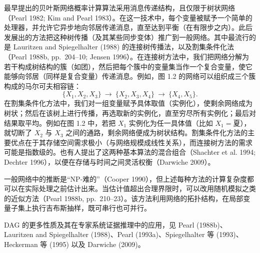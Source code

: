 最早提出的贝叶斯网络概率计算算法采用消息传递结构，且仅限于树状网络（Pearl 1982; Kim and Pearl 1983）。在这一技术中，每个变量被赋予一个简单的处理器，并允许它异步地向邻居传递消息，直至达到平衡（在有限步之内）。此后发展出的方法把这种树传播（及其某些同步变体）推广到一般网络。其中最流行的是 Lauritzen and Spiegelhalter (1988) 的连接树传播法，以及割集条件化法（Pearl 1988b, pp.~204--10; Jensen 1996）。在连接树方法中，我们把网络分解为若干构成树结构的簇（如团），然后把每个簇中的变量集当作一个复合变量，使它能够向邻居（同样是复合变量）传递消息。例如，图 1.2 的网络可以组织成三个簇构成的马尔可夫相容链：
\[
\{X_1,X_2,X_3\}\ \to\ \{X_2,X_3,X_4\}\ \to\ \{X_4,X_5\}.
\]
在割集条件化方法中，我们对一组变量赋予具体取值（实例化），使剩余网络成为树状；然后在该树上进行传播，再选取新的实例化，直至穷尽所有实例化；最后对结果取平均。例如在图 1.2 中，若把 $X_1$ 实例化为任一具体值（比如 $X_1=\text{夏}$），就切断了 $X_2$ 与 $X_3$ 之间的通路，剩余网络便成为树状结构。割集条件化方法的主要优点在于其存储空间需求极小（与网络规模成线性关系），而连接树方法的需求可能是指数级的。也有人提出了这两种基本算法的混合组合（Shachter et al. 1994; Dechter 1996），以便在存储与时间之间灵活权衡（Darwiche 2009）。

一般网络中的推断是“NP-难的”（Cooper 1990），但上述每种方法的计算复杂度都可以在实际处理之前估计出来。当估计值超出合理界限时，可以改用随机模拟之类的近似方法（Pearl 1988b, pp.~210--23）。该方法利用网络的拓扑结构，在局部变量子集上执行吉布斯抽样，既可串行也可并行。

DAG 的更多性质及其在专家系统证据推理中的应用，见 Pearl (1988b)、Lauritzen and Spiegelhalter (1988)、Pearl (1993a)、Spiegelhalter 等 (1993)、Heckerman 等 (1995) 以及 Darwiche (2009)。
